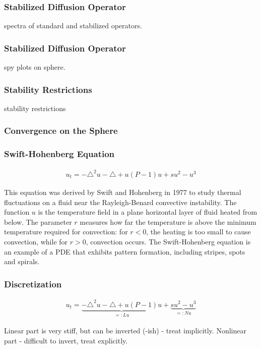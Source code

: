 \documentclass{beamer}
\begin{document}
\begin{frame}
\frametitle{Stabilized Diffusion Operator} 


spectra of standard and stabilized operators. 


\end{frame}


\begin{frame}
\frametitle{Stabilized Diffusion Operator} 

spy plots on sphere.

\end{frame}



\begin{frame}
\frametitle{Stability Restrictions }
 
stability restrictions 
 
\end{frame} 
 
 
\begin{frame}
\frametitle{Convergence on the Sphere}
 
\end{frame}  


\begin{frame}
\frametitle{Swift-Hohenberg Equation}
 

\begin{gather*}
u_t = -\triangle^2 u - \triangle + u (P-1)u + su^2 - u^3
\end{gather*} 
 
This equation was derived by Swift and Hohenberg in 1977 to study thermal fluctuations on a fluid near the Rayleigh-Benard
convective instability. The function $u$ is the temperature field in a plane horizontal layer of fluid heated from below. 
The parameter $r$ measures how far the temperature is above the minimum temperature required for convection: for $r<0$,
the heating is too small to cause convection, while for $r>0$, convection occurs. The Swift-Hohenberg equation is an example of 
a PDE that exhibits pattern formation, including stripes, spots and spirals.
 
\end{frame}
 
 
 
\begin{frame}
\frametitle{Discretization}
 
\begin{gather*}
u_t = \underbrace{-\triangle^2 u - \triangle + u (P-1)u}_{=:Lu} + \underbrace{su^2 - u^3}_{=:Nu}
\end{gather*} 
 
 
Linear part is very stiff, but can be inverted (-ish) - treat implicitly.
Nonlinear part - difficult to invert, treat explicitly.  
 
\end{frame} 
 
\end{document}
